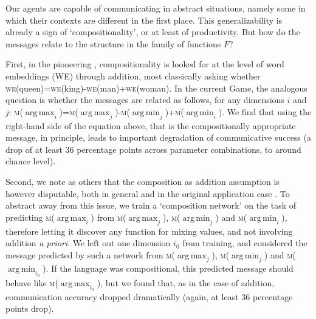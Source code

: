 \documentclass[11pt,a4paper]{article}
\DeclareMathOperator*{\argmax}{arg\,max}
\DeclareMathOperator*{\argmin}{arg\,min}
\newcommand{\nbEC}[1]{{\leavevmode\color{blue}{\scriptsize#1}}}
\newcommand{\nbSST}[1]{{\leavevmode\color{violet}{\scriptsize#1}}}
\begin{document}
Our agents are capable of communicating in abstract situations, namely some in which their contexts are different in the first place. This generalizability is already a sign of `compositionality', or at least of productivity. But how do the messages relate to the structure in the family of functions $F$? 

\newcommand{\WE}[1]{\textsc{we}(#1)}
\newcommand{\MESS}[1]{\textsc{m}(#1)}

First, in the pioneering \citealp{mikolov_efficient_2013}, compositionality is looked for at the level of word embeddings (WE) through addition, most classically asking whether  
\WE{queen}=\WE{king}-\WE{man}+\WE{woman}. In the current Game, the analogous question is whether the messages are related as follows, for any dimensions $i$ and $j$:
\MESS{$\argmax_i$}=\MESS{$\argmax_j$}-\MESS{$\argmin_j$}+\MESS{$\argmin_i$}. We find that using the right-hand side of the equation above, that is the compositionally appropriate message, in principle, leads to important degradation of communicative success (a drop of at least 36 percentage points across parameter combinations, to around chance level).

Second, we note as others that the composition as addition assumption is however disputable, both in general and in the original application case \citep{linzen-2016-issues, Chen2017}. To abstract away from this issue, we train a `composition network' \nbSST{very quick details of network structure here (2 layers of XXX w/ XXX activation)} on the task of predicting 
\MESS{$\argmax_i$} from \MESS{$\argmax_j$}, \MESS{$\argmin_j$} and \MESS{$\argmin_i$}, therefore letting it discover any function for mixing values, and not involving addition \emph{a priori}. We left out one dimension $i_0$ from training, and considered the message predicted by such a network from \MESS{$\argmax_j$}, \MESS{$\argmin_j$} and \MESS{$\argmin_{i_0}$}. If the language was compositional, this predicted message should behave like \MESS{$\argmax_{i_0}$}, but we found that, as in the case of addition, communication accuracy dropped dramatically (again, at least 36 percentage points drop).
\nbEC{cite Baroni's (or others) similar tests?}
\nbSST{Which did you have in mind?  The SCAN papers, or\dots?}
\end{document}
